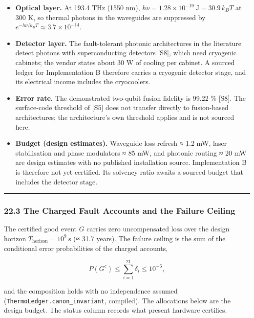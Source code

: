 \documentclass[
]{article}
\providecommand{\tightlist}{%
  \setlength{\itemsep}{0pt}\setlength{\parskip}{0pt}}
\begin{document}
\begin{itemize}
\tightlist
\item
  \textbf{Optical layer.} At 193.4 THz (1550 nm),
  \(h\nu = 1.28 \times 10^{-19}\ \mathrm{J} = 30.9\,k_B T\) at 300 K, so
  thermal photons in the waveguides are suppressed by
  \(e^{-h\nu/k_BT} \approx 3.7 \times 10^{-14}\).
\item
  \textbf{Detector layer.} The fault-tolerant photonic architectures in
  the literature detect photons with superconducting detectors {[}S8{]},
  which need cryogenic cabinets; the vendor states about 30 W of cooling
  per cabinet. A sourced ledger for Implementation B therefore carries a
  cryogenic detector stage, and its electrical income includes the
  cryocoolers.
\item
  \textbf{Error rate.} The demonstrated two-qubit fusion fidelity is
  99.22 \% {[}S8{]}. The surface-code threshold of {[}S5{]} does not
  transfer directly to fusion-based architectures; the architecture's
  own threshold applies and is not sourced here.
\item
  \textbf{Budget (design estimates).} Waveguide loss refresh ≈ 1.2 mW,
  laser stabilisation and phase modulators ≈ 85 mW, and photonic routing
  ≈ 20 mW are design estimates with no published installation source.
  Implementation B is therefore not yet certified. Its solvency ratio
  awaits a sourced budget that includes the detector stage.
\end{itemize}

\begin{center}\rule{0.5\linewidth}{0.5pt}\end{center}

\subsubsection{22.3 The Charged Fault Accounts and the Failure
Ceiling}\label{the-charged-fault-accounts-and-the-failure-ceiling}

The certified good event \(G\) carries zero uncompensated loss over the
design horizon \(T_{\mathrm{horizon}} = 10^9\ \mathrm{s}\) (≈ 31.7
years). The failure ceiling is the sum of the conditional error
probabilities of the charged accounts,

\[P(G^c) \le \sum_{i=1}^{21} \delta_i \le 10^{-6},\]

and the composition holds with no independence assumed
(\texttt{T\allowbreak{}h\allowbreak{}e\allowbreak{}r\allowbreak{}m\allowbreak{}o\allowbreak{}L\allowbreak{}e\allowbreak{}d\allowbreak{}g\allowbreak{}e\allowbreak{}r\allowbreak{}.\allowbreak{}c\allowbreak{}a\allowbreak{}n\allowbreak{}o\allowbreak{}n\allowbreak{}\_\allowbreak{}i\allowbreak{}n\allowbreak{}v\allowbreak{}a\allowbreak{}r\allowbreak{}i\allowbreak{}a\allowbreak{}n\allowbreak{}t},
compiled). The allocations below are the design budget. The status
column records what present hardware certifies.
\end{document}
